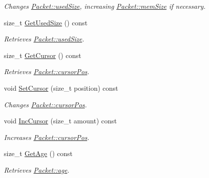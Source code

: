 \begin{DoxyCompactItemize}
\begin{DoxyCompactList}\small\item\em Changes \hyperlink{class_packet_a1da1eb4f461522942bada139f0d94acd}{Packet::usedSize}, increasing \hyperlink{class_packet_a1c2e5054d27221467e8db5dc9e71c04a}{Packet::memSize} if necessary. \item\end{DoxyCompactList}\item 
size\_\-t \hyperlink{class_packet_a443cddd3bfce9890d8ba59ffa42dbe1b}{GetUsedSize} () const 
\begin{DoxyCompactList}\small\item\em Retrieves \hyperlink{class_packet_a1da1eb4f461522942bada139f0d94acd}{Packet::usedSize}. \item\end{DoxyCompactList}\item 
size\_\-t \hyperlink{class_packet_a4864d45925c6798a6199929a038ca7f3}{GetCursor} () const 
\begin{DoxyCompactList}\small\item\em Retrieves \hyperlink{class_packet_acce561b50a43897e8fd0c03222b617bd}{Packet::cursorPos}. \item\end{DoxyCompactList}\item 
void \hyperlink{class_packet_addeffecd28116c91743d6dd908d1b9c6}{SetCursor} (size\_\-t position) const 
\begin{DoxyCompactList}\small\item\em Changes \hyperlink{class_packet_acce561b50a43897e8fd0c03222b617bd}{Packet::cursorPos}. \item\end{DoxyCompactList}\item 
void \hyperlink{class_packet_acc49a731fd83881c2d925ce1eccdefc2}{IncCursor} (size\_\-t amount) const 
\begin{DoxyCompactList}\small\item\em Increases \hyperlink{class_packet_acce561b50a43897e8fd0c03222b617bd}{Packet::cursorPos}. \item\end{DoxyCompactList}\item 
size\_\-t \hyperlink{class_packet_ac2b9d9a1cb9c9e785ff119c61d2b93c7}{GetAge} () const 
\begin{DoxyCompactList}\small\item\em Retrieves \hyperlink{class_packet_af82113a0e0b36819fcbe4b8245db579e}{Packet::age}. \item\end{DoxyCompactList}\item 

\end{DoxyCompactItemize}
